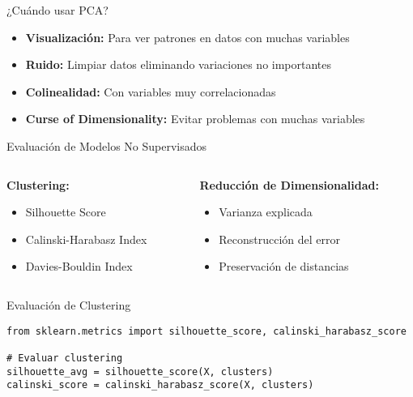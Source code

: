 \documentclass{beamer}
\begin{document}
\begin{frame}{¿Cuándo usar PCA?}
    \begin{itemize}
        \item<1-> \textbf{Visualización:} Para ver patrones en datos con muchas variables
        \item<2-> \textbf{Ruido:} Limpiar datos eliminando variaciones no importantes
        \item<3-> \textbf{Colinealidad:} Con variables muy correlacionadas
        \item<4-> \textbf{Curse of Dimensionality:} Evitar problemas con muchas variables
    \end{itemize}
\end{frame}

\begin{frame}{Evaluación de Modelos No Supervisados}
    \begin{columns}
        \begin{column}{0.5\textwidth}
            \textbf{Clustering:}
            \begin{itemize}
                \item<1-> Silhouette Score
                \item<2-> Calinski-Harabasz Index
                \item<3-> Davies-Bouldin Index
            \end{itemize}
        \end{column}
        \begin{column}{0.5\textwidth}
            \textbf{Reducción de Dimensionalidad:}
            \begin{itemize}
                \item<4-> Varianza explicada
                \item<5-> Reconstrucción del error
                \item<6-> Preservación de distancias
            \end{itemize}
        \end{column}
    \end{columns}
\end{frame}

\begin{frame}[fragile]{Evaluación de Clustering}
    \begin{lstlisting}
from sklearn.metrics import silhouette_score, calinski_harabasz_score

# Evaluar clustering
silhouette_avg = silhouette_score(X, clusters)
calinski_score = calinski_harabasz_score(X, clusters)
    \end{lstlisting}
\end{frame}
\end{document}

